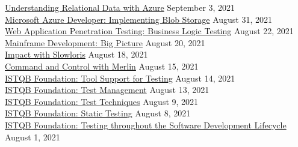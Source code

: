 \documentclass[10pt]{res} %
\begin{document}
\begin{resume}
\href{https://bjdelacruz.dev/files/certificates/pluralsight/6_Understanding_Relational_Data_with_Azure.pdf}{\color{blue}Understanding Relational Data with Azure} \hfill September 3, 2021 \\
\href{https://bjdelacruz.dev/files/certificates/pluralsight/Microsoft_Azure_Developer_Implementing_Blob_Storage.pdf}{\color{blue}Microsoft Azure Developer: Implementing Blob Storage} \hfill August 31, 2021 \\
\href{https://bjdelacruz.dev/files/certificates/pluralsight/Web_Application_Penetration_Testing_Business_Logic_Testing.pdf}{\color{blue}Web Application Penetration Testing: Business Logic Testing} \hfill August 22, 2021 \\
\href{https://bjdelacruz.dev/files/certificates/pluralsight/Mainframe_Development_Big_Picture.pdf}{\color{blue}Mainframe Development: Big Picture} \hfill August 20, 2021 \\
\href{https://bjdelacruz.dev/files/certificates/pluralsight/61_Impact_with_Slowloris.pdf}{\color{blue}Impact with Slowloris} \hfill August 18, 2021 \\
\href{https://bjdelacruz.dev/files/certificates/pluralsight/55_Command_and_Control_with_Merlin.pdf}{\color{blue}Command and Control with Merlin} \hfill August 15, 2021 \\
\href{https://bjdelacruz.dev/files/certificates/pluralsight/6_ISTQB_Foundation_Tool_Support_for_Testing.pdf}{\color{blue}ISTQB\textsuperscript{\textregistered} Foundation: Tool Support for Testing} \hfill August 14, 2021 \\
\href{https://bjdelacruz.dev/files/certificates/pluralsight/5_ISTQB_Foundation_Test_Management.pdf}{\color{blue}ISTQB\textsuperscript{\textregistered} Foundation: Test Management} \hfill August 13, 2021 \\
\href{https://bjdelacruz.dev/files/certificates/pluralsight/4_ISTQB_Foundation_Test_Techniques.pdf}{\color{blue}ISTQB\textsuperscript{\textregistered} Foundation: Test Techniques} \hfill August 9, 2021 \\
\href{https://bjdelacruz.dev/files/certificates/pluralsight/3_ISTQB_Foundation_Static_Testing.pdf}{\color{blue}ISTQB\textsuperscript{\textregistered} Foundation: Static Testing} \hfill August 8, 2021 \\
\href{https://bjdelacruz.dev/files/certificates/pluralsight/2_ISTQB_Foundation_Testing_throughout_the_Software_Development_Lifecycle.pdf}{\color{blue}ISTQB\textsuperscript{\textregistered} Foundation: Testing throughout the Software Development Lifecycle} \hfill August 1, 2021 \\

\end{resume}
\end{document}
